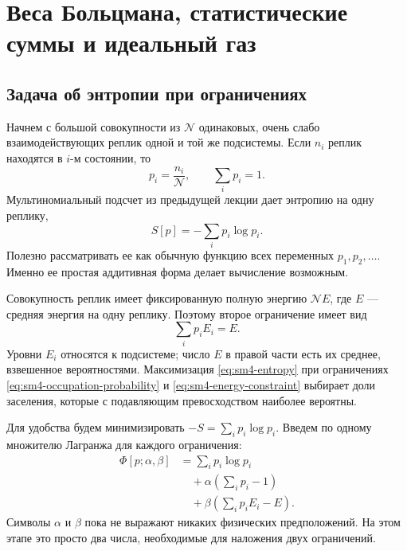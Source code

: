 \chapter{Веса Больцмана, статистические суммы и идеальный газ}


\section{Задача об энтропии при ограничениях}

Начнем с большой совокупности из \(\mathcal N\) одинаковых, очень слабо взаимодействующих реплик одной и той же подсистемы. Если \(n_i\) реплик находятся в \(i\)-м состоянии, то
\begin{equation}
 p_i=\frac{n_i}{\mathcal N},
 \qquad
 \sum_i p_i=1.
 \label{eq:sm4-occupation-probability}
\end{equation}
Мультиномиальный подсчет из предыдущей лекции дает энтропию на одну реплику,
\begin{equation}
 S[p]=-\sum_i p_i\log p_i.
 \label{eq:sm4-entropy}
\end{equation}
Полезно рассматривать ее как обычную функцию всех переменных \(p_1,p_2,\ldots\). Именно ее простая аддитивная форма делает вычисление возможным.

Совокупность реплик имеет фиксированную полную энергию \(\mathcal N E\), где \(E\) — средняя энергия на одну реплику. Поэтому второе ограничение имеет вид
\begin{equation}
 \sum_i p_iE_i=E.
 \label{eq:sm4-energy-constraint}
\end{equation}
Уровни \(E_i\) относятся к подсистеме; число \(E\) в правой части есть их среднее, взвешенное вероятностями. Максимизация
\eqref{eq:sm4-entropy}
при ограничениях
\eqref{eq:sm4-occupation-probability} и
\eqref{eq:sm4-energy-constraint} выбирает доли заселения, которые с подавляющим превосходством наиболее вероятны.

Для удобства будем минимизировать \(-S=\sum_i p_i\log p_i\). Введем по одному множителю Лагранжа для каждого ограничения:
\begin{equation}
 \begin{aligned}
 \Phi[p;\alpha,\beta]
 &=\sum_i p_i\log p_i\\
 &\quad+\alpha\left(\sum_i p_i-1\right)\\
 &\quad+\beta\left(\sum_i p_iE_i-E\right).
 \end{aligned}
 \label{eq:sm4-augmented-functional}
\end{equation}
Символы \(\alpha\) и \(\beta\) пока не выражают никаких физических предположений. На этом этапе это просто два числа, необходимые для наложения двух ограничений.

